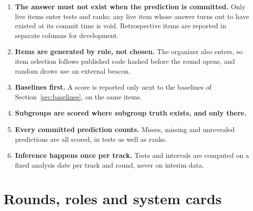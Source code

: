 \documentclass[11pt]{article}
\begin{document}
\begin{enumerate}
  \item \textbf{The answer must not exist when the prediction is committed.} Only live items enter tests and ranks; any live item whose answer turns out to have existed at its commit time is void. Retrospective items are reported in separate columns for development.
  \item \textbf{Items are generated by rule, not chosen.} The organizer also enters, so item selection follows published code hashed before the round opens, and random draws use an external beacon.
  \item \textbf{Baselines first.} A score is reported only next to the baselines of Section~\ref{sec:baselines}, on the same items.
  \item \textbf{Subgroups are scored where subgroup truth exists, and only there.}
  \item \textbf{Every committed prediction counts.} Misses, missing and unrevealed predictions are all scored, in tests as well as ranks.
  \item \textbf{Inference happens once per track.} Tests and intervals are computed on a fixed analysis date per track and round, never on interim data.
\end{enumerate}

\section{Rounds, roles and system cards}
\label{sec:rounds}
\end{document}
